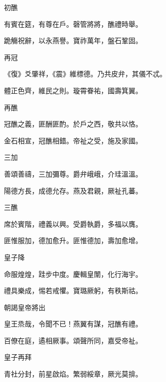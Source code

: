 \begin{pinyinscope}
 初醮



 有賓在筵，有尊在戶。磬管將將，醮禮時舉。



 跪觴祝辭，以永燕譽。寶祚萬年，盤石鞏固。



 再冠



 《復》爻肇祥，《震》維標德。乃共皮弁，其儀不忒。



 體正色齊，維民之則。璇霄眷祐，國壽箕翼。



 再醮



 冠醮之義，匪酬匪酌。於戶之西，敬共以恪。



 金石相宣，冠醮相錯。帝祉之受，施及家國。



 三加



 善頌善禱，三加彌尊。爵弁峨峨，介珪溫溫。



 陽德方長，成德允存。燕及君親，厥祉孔蕃。



 三醮



 席於賓階，禮義以興。受爵執爵，多福以膺。



 匪惟服加，德加愈升。匪惟德加，壽加愈增。



 皇子降



 命服煌煌，跬步中度。慶輯皇闈，化行海宇。



 禮具樂成，惕若戒懼。寶璐厥躬，有秩斯祜。



 朝謁皇帝將出



 皇王烝哉，令聞不已！燕翼有謀，冠醮有禮。



 百僚在庭，遹相厥事。頌聲所同，嘉受帝祉。



 皇子再拜



 青社分封，前星啟焰。繁弱綏章，厥光莫揜。




\end{pinyinscope}
